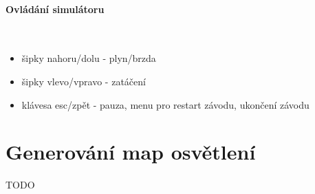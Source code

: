 \documentclass[11pt,twoside,a4paper]{book}
\begin{document}
\paragraph{Ovládání simulátoru}\ \ \\
\begin{itemize}
\item šipky nahoru/dolu - plyn/brzda
\item šipky vlevo/vpravo - zatáčení
\item klávesa esc/zpět - pauza, menu pro restart závodu, ukončení závodu
\end{itemize}

\section{Generování map osvětlení}
TODO
\end{document}
